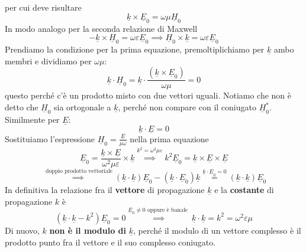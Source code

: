 \documentclass{book}
\begin{document}
    per cui deve risultare
    \begin{equation}
        \underline{k} \times \underline{E}_{0} = \omega \mu \underline{H}_{0}
    \end{equation}
    In modo analogo per la seconda relazione di Maxwell
    \begin{equation}
        - \underline{k} \times \underline{H}_{0} = \omega \varepsilon \underline{E}_{0} \implies \underline{H}_{0} \times \underline{k} = \omega \varepsilon \underline{E}_{0}
    \end{equation}
    Prendiamo la condizione per la prima equazione, premoltiplichiamo per $\underline{k}$ ambo membri e dividiamo per $\omega \mu$:
    \begin{equation}
        \underline{k} \cdot \underline{H}_{0} = \underline{k} \cdot \frac{(\underline{k} \times \underline{E}_{0})}{\omega \mu} = 0
    \end{equation}
    questo perché c'è un prodotto misto con due vettori uguali. Notiamo che non è detto che $\underline{H}_{0}$ sia ortogonale a $\underline{k}$, perché non compare con il coniugato $\underline{H}_{0} ^{*}$.
    \\ Similmente per $\underline{E}$:
    \begin{equation}
        \underline{k} \cdot \underline{E} = 0
    \end{equation}
    Sostituiamo l'espressione $\underline{H}_{0} = \frac{\underline{E}}{\mu \omega}$ nella prima equazione
    \begin{equation}
        \underline{E}_{0} = \frac{\underline{k} \times \underline{E}}{\omega ^{2} \mu \varepsilon} \times \underline{k} \stackrel{k^{2} = \omega^{2}\mu \varepsilon}{\implies} k^{2}\underline{E}_{0} = \underline{k} \times \underline{E} \times \underline{E}
    \end{equation}
    \begin{equation}
        \stackrel{\textrm{ doppio prodotto vettoriale}}{\implies} (\underline{k} \cdot \underline{k}) \underline{E}_{0} - (\underline{k} \cdot \underline{E}_{0}) \underline{k} \stackrel{\underline{k} \cdot \underline{E}_{0} = 0}{=} 
        (\underline{k} \cdot \underline{k}) \underline{E}_{0}
    \end{equation}
    In definitiva la relazione fra il \textbf{vettore} di propagazione $\underline{k}$ e la \textbf{costante} di propagazione $k$ è
    \begin{equation}
        (\underline{k} \cdot \underline{k} - k^{2})\underline{E}_{0} = 0 \stackrel{\underline{E}_{0} \neq 0 \textrm{ oppure è banale }}{\implies} \underline{k} \cdot \underline{k} = k^{2} = \omega^{2} \varepsilon \mu
    \end{equation}
    Di nuovo, $k$ \textbf{non è il modulo di} $\underline{k}$, perché il modulo di un vettore complesso è il prodotto punto fra il vettore e il suo complesso coniugato.
\end{document}
